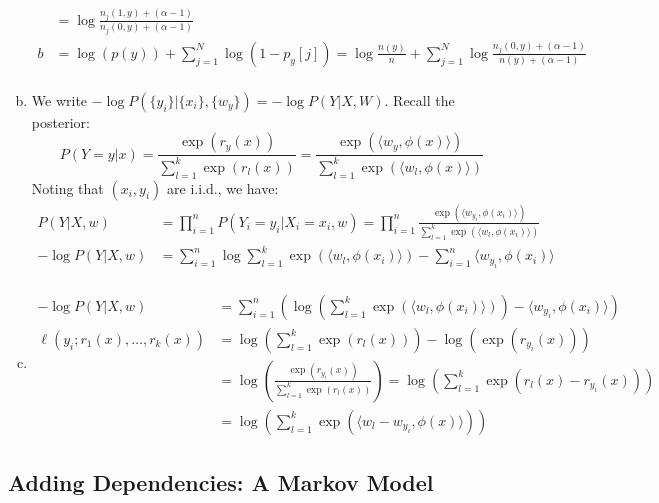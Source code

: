 \documentclass{amsart}
\theoremstyle{definition}
\begin{document}
\begin{enumerate}[(a)]
\begin{align*}
			&= \log \frac{n_j(1,y) + (\alpha - 1)}{n_j(0,y) + (\alpha - 1)}\\
			b &= \log(p(y)) + \sum_{j=1}^{N} \log(1-p_y[j]) = \log\frac{n(y)}{n} + \sum_{j=1}^{N} \log\frac{n_j(0,y) + (\alpha - 1)}{n(y) + (\alpha - 1)}\\
		\end{align*}
	\item 
		We write $-\log P(\{y_i\}|\{x_i\}, \{w_y\}) = -\log P(Y|X, W)$. Recall the posterior:
		\[P(Y = y| x) = \frac{\exp(r_y(x))}{\sum_{l=1}^{k}\exp(r_l(x))}= \frac{\exp(\langle w_y, \phi(x)\rangle)}{\sum_{l=1}^{k} \exp(\langle w_l, \phi(x) \rangle)}\]
		Noting that $(x_i, y_i)$ are i.i.d., we have:
		\begin{align*}
			P(Y|X, w) &= \prod_{i=1}^{n} P(Y_i = y_i|X_i = x_i, w) = \prod_{i=1}^{n} \frac{\exp(\langle w_{y_i}, \phi(x_i)\rangle)}{\sum_{l=1}^{k} \exp(\langle w_l, \phi(x_i) \rangle)}\\
			-\log P(Y|X, w) &= \sum_{i=1}^{n} \log \sum_{l=1}^{k} \exp(\langle w_l, \phi(x_i)\rangle) - \sum_{i=1}^{n} \langle w_{y_i}, \phi(x_i)\rangle\\
		\end{align*}
	\item 
		\begin{align*}
			-\log P(Y|X, w) &= \sum_{i=1}^{n} \left(\log\left(\sum_{l=1}^{k} \exp(\langle w_l, \phi(x_i)\rangle)\right) - \langle w_{y_i}, \phi(x_i)\rangle \right)\\
			\ell(y_i; r_1(x), \ldots, r_k(x))&= \log\left(\sum_{l=1}^{k} \exp(r_l(x))\right) - \log(\exp(r_{y_i}(x)))\\
			&= \log\left(\frac{\exp(r_{y_i}(x))}{\sum_{l=1}^{k} \exp(r_l(x))}\right) = \log\left(\sum_{l=1}^{k} \exp(r_l(x) - r_{y_i}(x))\right)\\
			&= \log\left(\sum_{l=1}^{k} \exp(\langle w_l - w_{y_i}, \phi(x)\rangle)\right)
		\end{align*}
\end{enumerate}
\subsection{Adding Dependencies: A Markov Model}
\end{document}
